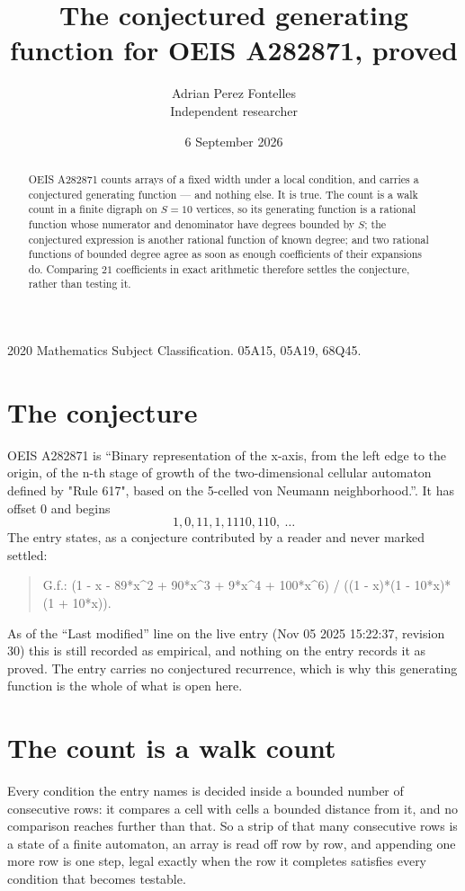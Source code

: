 \documentclass[11pt,a4paper]{article}
\title{The conjectured generating function for OEIS A282871, proved}
\author{Adrian Perez Fontelles\\ \small Independent researcher}
\date{6 September 2026}
\theoremstyle{plain}
\theoremstyle{definition}
\begin{document}
\maketitle

\begin{abstract}
OEIS A282871 counts arrays of a fixed width under a local condition, and carries a conjectured
generating function --- and nothing else. It is true. The count is a walk count in a finite
digraph on $S=10$ vertices, so its generating function is a rational function whose numerator
and denominator have degrees bounded by $S$; the conjectured expression is another rational
function of known degree; and two rational functions of bounded degree agree as soon as enough
coefficients of their expansions do. Comparing $21$ coefficients in exact arithmetic
therefore settles the conjecture, rather than testing it.
\end{abstract}

\noindent\small 2020 Mathematics Subject Classification. 05A15, 05A19, 68Q45.\normalsize

\section{The conjecture}

OEIS A282871 is ``Binary representation of the x-axis, from the left edge to the origin, of the n-th stage of growth of the two-dimensional cellular automaton defined by "Rule 617", based on the 5-celled von Neumann neighborhood.''. It has offset $0$ and begins
\[
1, 0, 11, 1, 1110, 110,\ \dots
\]
The entry states, as a conjecture contributed by a reader and never marked settled:
\begin{quote}
G.f.: (1 - x - 89*x\^{}2 + 90*x\^{}3 + 9*x\^{}4 + 100*x\^{}6) / ((1 - x)*(1 - 10*x)*(1 + 10*x)).
\end{quote}
As of the ``Last modified'' line on the live entry (Nov 05 2025 15:22:37, revision 30) this is still
recorded as empirical, and nothing on the entry records it as proved. The entry carries no
conjectured recurrence, which is why this generating function is the whole of what is open
here.

\section{The count is a walk count}

Every condition the entry names is decided inside a bounded number of consecutive rows: it
compares a cell with cells a bounded distance from it, and no comparison reaches further than
that. So a strip of that many consecutive rows is a state of a finite automaton, an array is
read off row by row, and appending one more row is one step, legal exactly when the row it
completes satisfies every condition that becomes testable.
\end{document}
